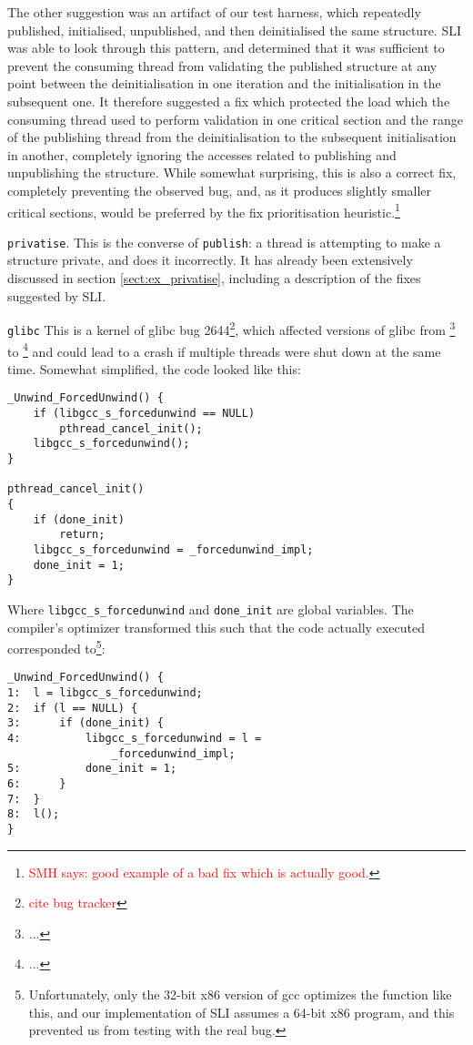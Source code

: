 \documentclass[10pt,twocolumn,preprint,natbib,authoryear]{sigplanconf}
\newcommand{\editorial}[1]{\textcolor{red}{\footnote{\textcolor{red}{#1}}}}
\newcommand{\smh}[1]{\editorial{SMH says: #1}}
\begin{document}
The other suggestion was an artifact of our test harness, which
repeatedly published, initialised, unpublished, and then deinitialised
the same structure.  SLI was able to look through this pattern, and
determined that it was sufficient to prevent the consuming thread from
validating the published structure at any point between the
deinitialisation in one iteration and the initialisation in the
subsequent one.  It therefore suggested a fix which protected the load
which the consuming thread used to perform validation in one critical
section and the range of the publishing thread from the
deinitialisation to the subsequent initialisation in another,
completely ignoring the accesses related to publishing and
unpublishing the structure.  While somewhat surprising, this is also a
correct fix, completely preventing the observed bug, and, as it
produces slightly smaller critical sections, would be preferred by the
fix prioritisation heuristic.\smh{good example of a bad fix which is
  actually good.}

\verb|privatise|.  This is the converse of \verb|publish|: a thread is
attempting to make a structure private, and does it incorrectly.  It
has already been extensively discussed in section
\ref{sect:ex_privatise}, including a description of the fixes
suggested by SLI.

\verb|glibc| This is a kernel of glibc bug 2644\editorial{cite bug
  tracker}, which affected versions of glibc from \editorial{...}  to
\editorial{...} and could lead to a crash if multiple threads were
shut down at the same time.  Somewhat simplified, the code looked like
this:

\begin{verbatim}
_Unwind_ForcedUnwind() {
    if (libgcc_s_forcedunwind == NULL)
        pthread_cancel_init();
    libgcc_s_forcedunwind();
}

pthread_cancel_init()
{
    if (done_init)
        return;
    libgcc_s_forcedunwind = _forcedunwind_impl;
    done_init = 1;
}
\end{verbatim}

Where \verb|libgcc_s_forcedunwind| and \verb|done_init| are global
variables.  The compiler's optimizer transformed this such that the
code actually executed corresponded to\footnote{Unfortunately, only
  the 32-bit x86 version of gcc optimizes the function like this, and
  our implementation of SLI assumes a 64-bit x86 program, and this
  prevented us from testing with the real bug.}:

\begin{verbatim}
_Unwind_ForcedUnwind() {
1:  l = libgcc_s_forcedunwind;
2:  if (l == NULL) {
3:      if (done_init) {
4:          libgcc_s_forcedunwind = l =
                _forcedunwind_impl;
5:          done_init = 1;
6:      }
7:  }
8:  l();
}
\end{verbatim}
\end{document}
